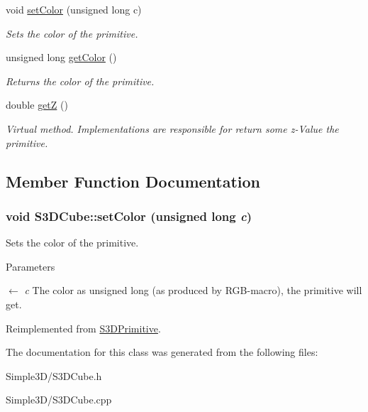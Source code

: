 \begin{DoxyCompactItemize}
\item 
void \hyperlink{class_s3_d_cube_a9c48875a16cc0ace3a3092e98663b785}{setColor} (unsigned long c)
\begin{DoxyCompactList}\small\item\em Sets the color of the primitive. \item\end{DoxyCompactList}\item 
\hypertarget{class_s3_d_cube_ab856b6fa4c1b72be7d2d7b79e26f3c38}{
unsigned long \hyperlink{class_s3_d_cube_ab856b6fa4c1b72be7d2d7b79e26f3c38}{getColor} ()}
\label{class_s3_d_cube_ab856b6fa4c1b72be7d2d7b79e26f3c38}

\begin{DoxyCompactList}\small\item\em Returns the color of the primitive. \item\end{DoxyCompactList}\item 
\hypertarget{class_s3_d_cube_a4ac1d080b330d6b69d24097f746ddd4c}{
double \hyperlink{class_s3_d_cube_a4ac1d080b330d6b69d24097f746ddd4c}{getZ} ()}
\label{class_s3_d_cube_a4ac1d080b330d6b69d24097f746ddd4c}

\begin{DoxyCompactList}\small\item\em Virtual method. Implementations are responsible for return some z-\/Value the primitive. \item\end{DoxyCompactList}\end{DoxyCompactItemize}


\subsection{Member Function Documentation}
\hypertarget{class_s3_d_cube_a9c48875a16cc0ace3a3092e98663b785}{
\subsubsection[{setColor}]{\setlength{\rightskip}{0pt plus 5cm}void S3DCube::setColor (unsigned long {\em c})}}
\label{class_s3_d_cube_a9c48875a16cc0ace3a3092e98663b785}


Sets the color of the primitive. 


\begin{DoxyParams}{Parameters}
\item[\mbox{$\leftarrow$} {\em c}]The color as unsigned long (as produced by RGB-\/macro), the primitive will get. \end{DoxyParams}


Reimplemented from \hyperlink{class_s3_d_primitive_a1c8f036193987522bdfb6a49b9b74000}{S3DPrimitive}.



The documentation for this class was generated from the following files:\begin{DoxyCompactItemize}
\item 
Simple3D/S3DCube.h\item 
Simple3D/S3DCube.cpp\end{DoxyCompactItemize}
